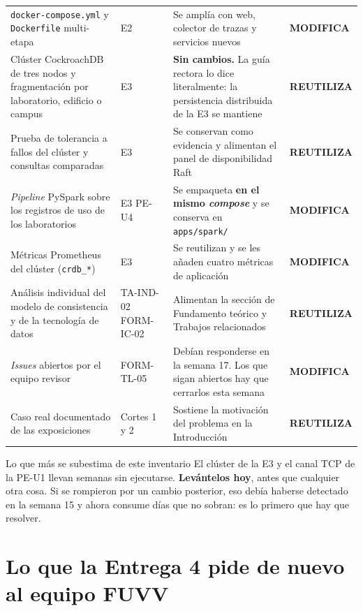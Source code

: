 \documentclass[11pt,a4paper]{article}
\newcommand{\reuso}{\cellcolor{filaReuso}\textbf{REUTILIZA}}
\newcommand{\cambia}{\cellcolor{filaCambia}\textbf{MODIFICA}}
\begin{document}
\begin{center}
\begin{longtable}{@{}p{3.7cm}p{1.5cm}p{5.2cm}p{4.4cm}@{}}
		\addlinespace
		\texttt{docker-compose.yml} y \texttt{Dockerfile} multi-etapa & E2 & Se amplía con web, colector de trazas y servicios nuevos & \cambia \\
		\addlinespace
		Clúster CockroachDB de tres nodos y fragmentación por laboratorio, edificio o campus & E3 & \textbf{Sin cambios.} La guía rectora lo dice literalmente: la persistencia distribuida de la E3 se mantiene & \reuso \\
		\addlinespace
		Prueba de tolerancia a fallos del clúster y consultas comparadas & E3 & Se conservan como evidencia y alimentan el panel de disponibilidad Raft & \reuso \\
		\addlinespace
		\emph{Pipeline} PySpark sobre los registros de uso de los laboratorios & E3 \newline PE-U4 & Se empaqueta \textbf{en el mismo \emph{compose}} y se conserva en \texttt{apps/spark/} & \cambia \\
		\addlinespace
		Métricas Prometheus del clúster (\texttt{crdb\_*}) & E3 & Se reutilizan y se les añaden cuatro métricas de aplicación & \cambia \\
		\addlinespace
		Análisis individual del modelo de consistencia y de la tecnología de datos & TA-IND-02 \newline FORM-IC-02 & Alimentan la sección de Fundamento teórico y Trabajos relacionados & \reuso \\
		\addlinespace
		\emph{Issues} abiertos por el equipo revisor & FORM-TL-05 & Debían responderse en la semana 17. Los que sigan abiertos hay que cerrarlos esta semana & \cambia \\
		\addlinespace
		Caso real documentado de las exposiciones & Cortes 1 y 2 & Sostiene la motivación del problema en la Introducción & \reuso \\
		\bottomrule
	\end{longtable}
\end{center}

\begin{avisoBox}{Lo que más se subestima de este inventario}
	El clúster de la E3 y el canal TCP de la PE-U1 llevan semanas sin ejecutarse. \textbf{Levántelos hoy}, antes que cualquier otra cosa. Si se rompieron por un cambio posterior, eso debía haberse detectado en la semana 15 y ahora consume días que no sobran: es lo primero que hay que resolver.
\end{avisoBox}

\section{Lo que la Entrega 4 pide de nuevo al equipo FUVV}
\end{document}
